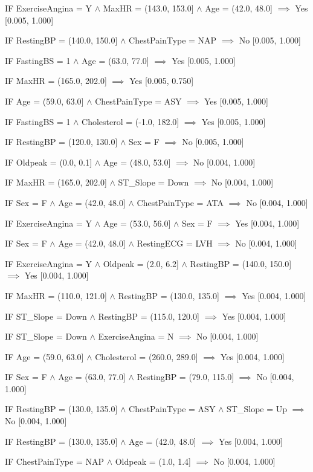 IF ExerciseAngina = Y $\land$ MaxHR = (143.0, 153.0] $\land$ Age = (42.0, 48.0] $\implies$ Yes [0.005, 1.000]

IF RestingBP = (140.0, 150.0] $\land$ ChestPainType = NAP $\implies$ No [0.005, 1.000]

IF FastingBS = 1 $\land$ Age = (63.0, 77.0] $\implies$ Yes [0.005, 1.000]

IF MaxHR = (165.0, 202.0] $\implies$ Yes [0.005, 0.750]

IF Age = (59.0, 63.0] $\land$ ChestPainType = ASY $\implies$ Yes [0.005, 1.000]

IF FastingBS = 1 $\land$ Cholesterol = (-1.0, 182.0] $\implies$ Yes [0.005, 1.000]

IF RestingBP = (120.0, 130.0] $\land$ Sex = F $\implies$ No [0.005, 1.000]

IF Oldpeak = (0.0, 0.1] $\land$ Age = (48.0, 53.0] $\implies$ No [0.004, 1.000]

IF MaxHR = (165.0, 202.0] $\land$ ST\_Slope = Down $\implies$ No [0.004, 1.000]

IF Sex = F $\land$ Age = (42.0, 48.0] $\land$ ChestPainType = ATA $\implies$ No [0.004, 1.000]

IF ExerciseAngina = Y $\land$ Age = (53.0, 56.0] $\land$ Sex = F $\implies$ Yes [0.004, 1.000]

IF Sex = F $\land$ Age = (42.0, 48.0] $\land$ RestingECG = LVH $\implies$ No [0.004, 1.000]

IF ExerciseAngina = Y $\land$ Oldpeak = (2.0, 6.2] $\land$ RestingBP = (140.0, 150.0] $\implies$ Yes [0.004, 1.000]

IF MaxHR = (110.0, 121.0] $\land$ RestingBP = (130.0, 135.0] $\implies$ Yes [0.004, 1.000]

IF ST\_Slope = Down $\land$ RestingBP = (115.0, 120.0] $\implies$ Yes [0.004, 1.000]

IF ST\_Slope = Down $\land$ ExerciseAngina = N $\implies$ No [0.004, 1.000]

IF Age = (59.0, 63.0] $\land$ Cholesterol = (260.0, 289.0] $\implies$ Yes [0.004, 1.000]

IF Sex = F $\land$ Age = (63.0, 77.0] $\land$ RestingBP = (79.0, 115.0] $\implies$ No [0.004, 1.000]

IF RestingBP = (130.0, 135.0] $\land$ ChestPainType = ASY $\land$ ST\_Slope = Up $\implies$ No [0.004, 1.000]

IF RestingBP = (130.0, 135.0] $\land$ Age = (42.0, 48.0] $\implies$ Yes [0.004, 1.000]

IF ChestPainType = NAP $\land$ Oldpeak = (1.0, 1.4] $\implies$ No [0.004, 1.000]

